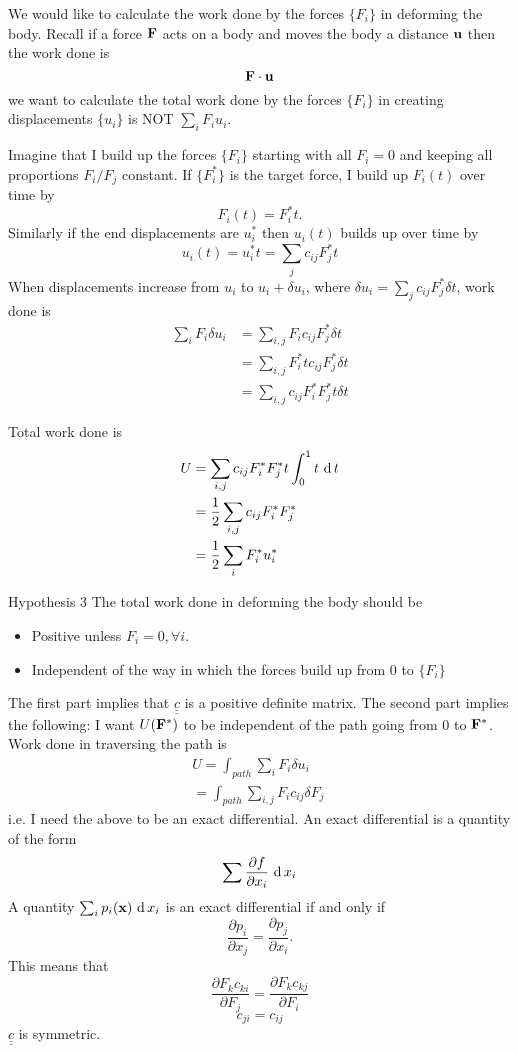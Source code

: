 \documentclass[12pt]{article}
\newcommand{\xx}{{\bf x}}
\newcommand{\uu}{{\bf u}}
\newcommand{\FF}{{\bf F}}
\newcommand{\cc}{{\underline{\underline c}}}
\newcommand{\dx}[1]{\text{ d\,}#1}
\begin{document}
We would like to calculate the work done by the forces $\{F_i\}$ in deforming the body. Recall if a force $\FF$ acts on a body and moves the body a distance $\uu$ then the work done is 
\[
\FF\cdot\uu
\]
we want to calculate the total work done by the forces $\{F_i\}$ in creating displacements $\{u_i\}$ is NOT $\sum_i F_i u_i$.

Imagine that I build up the forces $\{F_i\}$ starting with all $F_i=0$ and keeping all proportions $F_i/F_j$ constant.
If $\{F_i^*\}$ is the target force, I build up $F_i(t)$ over time by 
\[
F_i(t) = F_i^*t.
\]
Similarly if the end displacements are $u_i^*$ then $u_i(t)$ builds up over time by 
\[
u_i(t) = u_i^*t = \sum_j c_{ij} F_j^*t
\]
When displacements increase from $u_i$ to $u_i+\delta u_i$, where $\delta u_i= \sum_j c_{ij} F_j^*\delta t$, work done is 
\begin{align*}
\sum_i F_i \delta u_i &= \sum_{i,j} F_ic_{ij}F_j^*\delta t\\
	&= \sum_{i,j} F_i^*tc_{ij}F_j^*\delta t\\
	&= \sum_{i,j} c_{ij}F_i^*F_j^*t\delta t
\end{align*}

Total work done is 
\begin{align*}
U &= \sum_{i,j} c_{ij}F_i^*F_j^*t\int_0^1 t \dx{t}\\
	&=\frac 1 2 \sum_{i,j} c_{ij}F_i^*F_j^*\\
	&=\frac 1 2 \sum_i F_i^* u_i^*
\end{align*}

Hypothesis 3
The total work done in deforming the body should be 
\begin{itemize}
\item Positive unless $F_i=0, \forall i$.
\item Independent of the way in which the forces build up from 0 to $\{F_i\}$
\end{itemize}

The first part implies that $\cc$ is a positive definite matrix.
The second part implies the following:
I want $U(\FF^*)$ to be independent of the path going from 0 to $\FF^*$. Work done in traversing the path is
\begin{align*}
U = \int_{path} \sum_iF_i\delta u_i\\
	=  \int_{path} \sum_{i,j} F_i c_{ij}\delta F_j\
\end{align*} 
i.e. I need the above to be an exact differential. An exact differential is a quantity of the form 
\[
\sum\frac{\partial f}{\partial x_i} \dx{x_i}
\]
A quantity $\sum_i p_i(\xx) \dx{x_i}$ is an exact differential if and only if 
\[
\frac{\partial p_i}{\partial x_j} = \frac{\partial p_j}{\partial x_i}.
\]
This means that 
\[
\frac{\partial F_kc_{ki}}{\partial F_j} = \frac{\partial F_kc_{kj}}{\partial F_i} 
\]
\[c_{ji} = c_{ij}\]
$\cc$ is symmetric.
\end{document}
